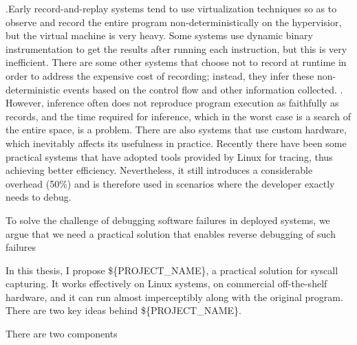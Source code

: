  .Early record-and-replay systems tend to use virtualization techniques so as to
observe and record the entire program non-deterministically on the hypervisior,
but the virtual machine is very heavy. \cite{dunlap_revirt_2003} Some systems
use dynamic binary instrumentation to get the results after running each
instruction, but this is very inefficient. \cite{bhansali_framework_2006} There
are some other systems that choose not to record at runtime in order to address
the expensive cost of recording; instead, they infer these non-deterministic
events based on the control flow and other information collected.
\cite{altekar_odr_2009,cui_rept_2018}. However, inference often does not
reproduce program execution as faithfully as records, and the time required for
inference, which in the worst case is a search of the entire space, is a
problem. There are also systems that use custom hardware, which inevitably
affects its usefulness in practice. Recently there have been some practical
systems that have adopted tools provided by Linux for tracing, thus achieving
better efficiency. Nevertheless, it still introduces a considerable overhead (50\%) and
is therefore used in scenarios where the developer exactly needs to
debug.\cite{203227}


To solve the challenge of debugging software failures in deployed systems, we argue that we need a practical solution that enables reverse debugging of such failures

In this thesis, I propose \$\{PROJECT\_NAME\}, a practical solution for syscall capturing. It works effectively on Linux systems, on commercial off-the-shelf hardware, and it can run almost imperceptibly along with the original program. There are two key ideas behind \$\{PROJECT\_NAME\}. 

There are two components 


